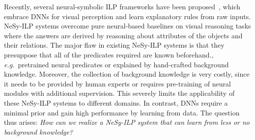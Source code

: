 \documentclass[
]{ceurart}
\newcommand{\hk}[1]{\textcolor{Apricot}{[#1 \textsc{--HK}]}}
\newcommand{\eg}{\emph{e.g.}~}
\begin{document}
	Recently, several neural-symbolic ILP frameworks have been proposed~\cite{Evans2018,Shindo2023alphailp}, which embrace DNNs for visual perception and learn explanatory rules from raw inputs.
	NeSy-ILP systems overcome pure neural-based baselines on visual reasoning tasks where the answers are derived by reasoning about attributes of the objects and their relations.
	The major flaw in existing NeSy-ILP systems is that they presuppose that all of the predicates required are known beforehand., \eg pretrained neural predicates or explained by hand-crafted background knowledge.
	Moreover, the collection of background knowledge is very costly, since it needs to be provided by human experts or requires pre-training of neural modules with additional supervision.
	This severely limits the applicability of these NeSy-ILP systems to different domains.
	In contrast, DNNs require a minimal prior and gain high performance by learning from data. The question thus arises: \emph{How can we realize a NeSy-ILP system that can learn from less or no background knowledge?}
	
\end{document}
